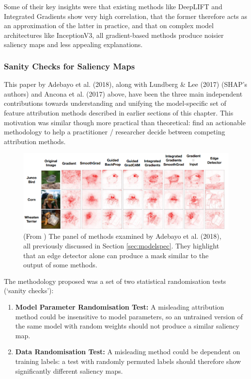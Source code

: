 \documentclass[main]{subfiles}
\begin{document}
Some of their key insights were that existing methods like DeepLIFT and Integrated Gradients show very high correlation, that the former therefore acts as an approximation of the latter in practice, and that on complex model architectures like InceptionV3, all gradient-based methods produce noisier saliency maps and less appealing explanations.

\subsubsection{Sanity Checks for Saliency Maps \cite{sanity}}




This paper by Adebayo et al. (2018), along with Lundberg \& Lee (2017) (SHAP's authors) and Ancona et al. (2017) above, have been the three main independent contributions towards understanding and unifying the model-specific set of feature attribution methods described in earlier sections of this chapter. This motivation was similar though more practical than theoretical: find an actionable methodology to help a practitioner / researcher decide between competing attribution methods.

\begin{figure}[h]
\centering
\includegraphics[scale=0.55]{adebayo_panel.png}
\caption{(From \cite{sanity}) The panel of methods examined by Adebayo et al. (2018), all previously discussed in Section \ref{sec:modelspec}. They highlight that an edge detector alone can produce a mask similar to the output of some methods.}
\label{adebayoimg}
\end{figure}


The methodology proposed was a set of two statistical randomisation tests (`sanity checks'):

\begin{enumerate}
\item \textbf{Model Parameter Randomisation Test:} A misleading attribution method could be insensitive to model parameters, so an untrained version of the same model with random weights should not produce a similar saliency map.
\item \textbf{Data Randomisation Test:} A misleading method could be dependent on training labels: a test with randomly permuted labels should therefore show significantly different saliency maps.
\end{enumerate}
\end{document}
